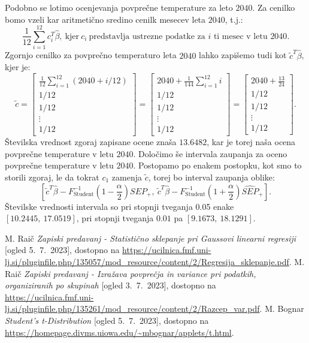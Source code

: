 \documentclass{article}
\begin{document}
Podobno se lotimo ocenjevanja povprečne temperature za leto $2040$. Za cenilko bomo vzeli kar aritmetično sredino cenilk mesecev leta $2040$, t.j.:
$$
\frac{1}{12}\sum_{i=1}^{12}{c_i^T \hat{\beta}},~\text{kjer}~c_i~\text{predstavlja ustrezne podatke za $i$ ti mesec v letu $2040$}. 
$$
Zgornjo cenilko za povprečno temperaturo leta $2040$ lahko zapišemo tudi kot $\tilde{c}^{T} \hat{\beta}$, kjer je:
$$
\tilde{c} = \begin{bmatrix}
    \frac{1}{12}\sum_{i=1}^{12}{(2040 + i/12)}\\
    1/12\\
    1/12\\
    \vdots\\
    1/12
\end{bmatrix}=
\begin{bmatrix}
    2040 + \frac{1}{144}\sum_{i=1}^{12}{i}\\
    1/12\\
    1/12\\
    \vdots\\
    1/12
\end{bmatrix}=
\begin{bmatrix}
    2040 + \frac{13}{24}\\
    1/12\\
    1/12\\
    \vdots\\
    1/12
\end{bmatrix}.
$$
Številska vrednost zgoraj zapisane ocene znaša $13.6482$, kar je torej naša ocena povprečne temperature v letu $2040$.
\newline
Določimo še intervala zaupanja za oceno povprečne temperature v letu $2040$. Postopamo po enakem postopku, kot smo to storili zgoraj, le da tokrat $c_1$ zamenja $\tilde{c}$, torej bo interval zaupanja oblike:
$$
[\tilde{c}^T\hat{\beta} - F^{-1}_{\text{Student}}\left(1 - \frac{\alpha}{2}\right)\widehat{SEP}_{+} ,~\tilde{c}^T\hat{\beta} - F^{-1}_{\text{Student}}\left(1 + \frac{\alpha}{2}\right)\widehat{SEP}_{+} ].
$$
Številske vrednosti intervala so pri stopnji tveganja 0.05 enake $[10.2445,~17.0519]$, pri stopnji tveganja $0.01$ pa $[9.1673,~18.1291]$.








\pagebreak


\begin{thebibliography}{9}
        M. Raič \emph{Zapiski predavanj - Statistično sklepanje pri Gaussovi linearni regresiji} [ogled 5.~7.~2023], dostopno na \url{https://ucilnica.fmf.uni-lj.si/pluginfile.php/135057/mod_resource/content/2/Regresija_sklepanje.pdf}.
        M. Raič \emph{Zapiski predavanj - Izražava povprečja in variance pri podatkih, organiziranih po skupinah} [ogled 3.~7.~2023], dostopno na \url{https://ucilnica.fmf.uni-lj.si/pluginfile.php/135261/mod_resource/content/2/Razcep_var.pdf}.
        M. Bognar \emph{Student's t-Distribution} [ogled 5.~7.~2023], dostopno na \url{https://homepage.divms.uiowa.edu/~mbognar/applets/t.html}.
\end{thebibliography}
\end{document}
